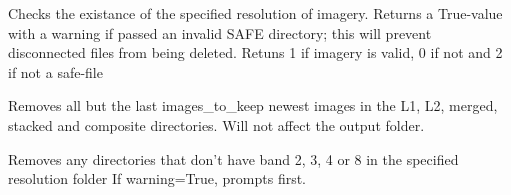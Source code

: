 \documentclass[letterpaper,10pt,english]{sphinxmanual}
\begin{document}

\begin{fulllineitems}
\label{\detokenize{index:pyeo.filesystem_utilities.check_for_invalid_l2_data}}
Checks the existance of the specified resolution of imagery. Returns a True-value with a warning if passed
an invalid SAFE directory; this will prevent disconnected files from being deleted.
Retuns 1 if imagery is valid, 0 if not and 2 if not a safe-file

\end{fulllineitems}


\begin{fulllineitems}
\label{\detokenize{index:pyeo.filesystem_utilities.clean_aoi}}
Removes all but the last images\_to\_keep newest images in the L1, L2, merged, stacked and
composite directories. Will not affect the output folder.

\end{fulllineitems}


\begin{fulllineitems}
\label{\detokenize{index:pyeo.filesystem_utilities.clean_l2_data}}
Removes any directories that don’t have band 2, 3, 4 or 8 in the specified resolution folder
If warning=True, prompts first.

\end{fulllineitems}

\end{document}
